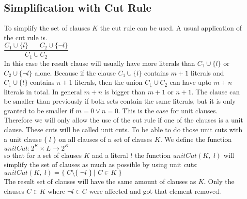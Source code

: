 \subsection{Simplification with Cut Rule} %
To simplify the set of clauses $K$ the cut rule can be used. A usual application of the cut rule is.
\\
\hspace*{1.3cm}
$\dfrac{C_1 \cup \{ l \} \;\;\;\;\;\; C_2 \cup \{ \neg l \}}{C_1 \cup C_2}$
\\[0.2cm]
In this case the result clause will usually have more literals than $C_1 \cup \{ l \}$ or $C_2 \cup \{ \neg l \}$ alone. Because if the clause $C_1 \cup \{ l \}$ contains $m + 1$ literals and $C_1 \cup \{ l \}$ contains $n + 1$ literals, then the union $C_1 \cup C_2$ can have upto $m + n$ literals in total. In general $m + n$ is bigger than $m + 1$ or $n + 1$. The clause can be smaller than previously if both sets contain the same literals, but it is only granted to be smaller if $m = 0 \lor n = 0$. This is the case for unit clauses. Therefore we will only allow the use of the cut rule if one of the clauses is a unit clause. These cuts will be called unit cuts. To be able to do those unit cuts with a unit clause $\{\; l\; \}$ on all clauses of a set of clauses $K$. We define the function
\\
\hspace*{1.3cm}
$unitCut: 2^{K} \times L \to 2^{K}$
\\[0.2cm]
so that for a set of clauses $K$ and a literal $l$ the function $unitCut(K,\; l)$ will simplify the set of clauses as much as possible by using unit cuts:
\\
\hspace*{1.3cm}
$unitCut(K,\; l) = \{\; C \setminus \{\; \neg l\; \}\; |\; C \in K\; \}$
\\[0.2cm]
The result set of clauses will have the same amount of clauses as $K$. Only the clauses $C \in K$ where $\neg l \in C$ were affected and got that element removed.

